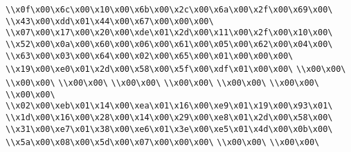 \verb|\\x0f\x00\x6c\x00\x10\x00\x6b\x00\x2c\x00\x6a\x00\x2f\x00\x69\x00\|\newline
\verb|\\x43\x00\xdd\x01\x44\x00\x67\x00\x00\x00\|\newline
\verb|\\x07\x00\x17\x00\x20\x00\xde\x01\x2d\x00\x11\x00\x2f\x00\x10\x00\|\newline
\verb|\\x52\x00\x0a\x00\x60\x00\x06\x00\x61\x00\x05\x00\x62\x00\x04\x00\|\newline
\verb|\\x63\x00\x03\x00\x64\x00\x02\x00\x65\x00\x01\x00\x00\x00\|\newline
\verb|\\x19\x00\xe0\x01\x2d\x00\x58\x00\x5f\x00\xdf\x01\x00\x00\|\newline
\verb|\\x00\x00\|\newline
\verb|\\x00\x00\|\newline
\verb|\\x00\x00\|\newline
\verb|\\x00\x00\|\newline
\verb|\\x00\x00\|\newline
\verb|\\x00\x00\|\newline
\verb|\\x00\x00\|\newline
\verb|\\x00\x00\|\newline
\verb|\\x02\x00\xeb\x01\x14\x00\xea\x01\x16\x00\xe9\x01\x19\x00\x93\x01\|\newline
\verb|\\x1d\x00\x16\x00\x28\x00\x14\x00\x29\x00\xe8\x01\x2d\x00\x58\x00\|\newline
\verb|\\x31\x00\xe7\x01\x38\x00\xe6\x01\x3e\x00\xe5\x01\x4d\x00\x0b\x00\|\newline
\verb|\\x5a\x00\x08\x00\x5d\x00\x07\x00\x00\x00\|\newline
\verb|\\x00\x00\|\newline
\verb|\\x00\x00\|\newline
